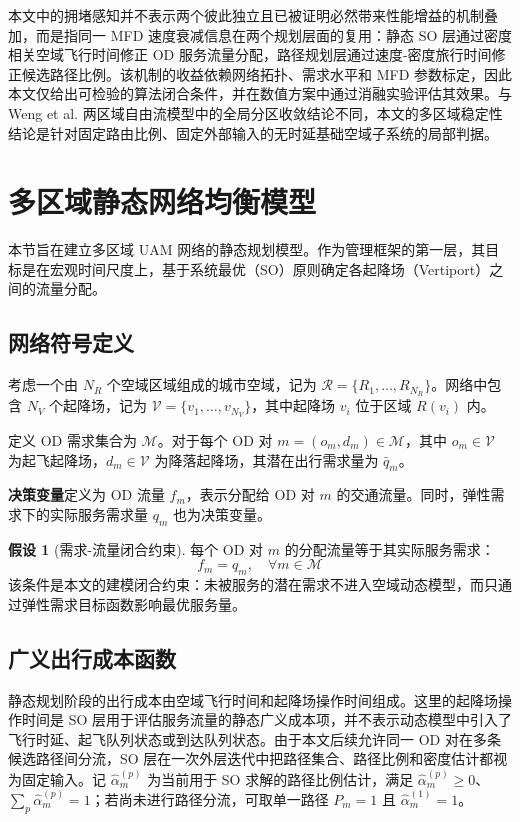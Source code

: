 \documentclass[a4paper,12pt]{article}
\theoremstyle{plain}
\theoremstyle{definition}
\newtheorem{assumption}[theorem]{假设}
\theoremstyle{remark}
\begin{document}
本文中的拥堵感知并不表示两个彼此独立且已被证明必然带来性能增益的机制叠加，而是指同一 MFD 速度衰减信息在两个规划层面的复用：静态 SO 层通过密度相关空域飞行时间修正 OD 服务流量分配，路径规划层通过速度-密度旅行时间修正候选路径比例。该机制的收益依赖网络拓扑、需求水平和 MFD 参数标定，因此本文仅给出可检验的算法闭合条件，并在数值方案中通过消融实验评估其效果。与 Weng et al. 两区域自由流模型中的全局分区收敛结论不同，本文的多区域稳定性结论是针对固定路由比例、固定外部输入的无时延基础空域子系统的局部判据。

\section{多区域静态网络均衡模型}

本节旨在建立多区域 UAM 网络的静态规划模型。作为管理框架的第一层，其目标是在宏观时间尺度上，基于系统最优（SO）原则确定各起降场（Vertiport）之间的流量分配。

\subsection{网络符号定义}
考虑一个由 $N_R$ 个空域区域组成的城市空域，记为 $\mathcal{R} = \{R_1, \dots, R_{N_R}\}$。网络中包含 $N_V$ 个起降场，记为 $\mathcal{V} = \{v_1, \dots, v_{N_V}\}$，其中起降场 $v_i$ 位于区域 $R(v_i)$ 内。

定义 OD 需求集合为 $\mathcal{M}$。对于每个 OD 对 $m = (o_m, d_m) \in \mathcal{M}$，其中 $o_m \in \mathcal{V}$ 为起飞起降场，$d_m \in \mathcal{V}$ 为降落起降场，其潜在出行需求量为 $\bar{q}_m$。

\textbf{决策变量}定义为 OD 流量 $f_m$，表示分配给 OD 对 $m$ 的交通流量。同时，弹性需求下的实际服务需求量 $q_m$ 也为决策变量。

\begin{assumption}[需求-流量闭合约束]\label{asm:flow_demand}
每个 OD 对 $m$ 的分配流量等于其实际服务需求：
\begin{equation}\label{eq:flow_demand}
    f_m = q_m, \quad \forall m \in \mathcal{M}
\end{equation}
该条件是本文的建模闭合约束：未被服务的潜在需求不进入空域动态模型，而只通过弹性需求目标函数影响最优服务量。
\end{assumption}

\subsection{广义出行成本函数}
静态规划阶段的出行成本由空域飞行时间和起降场操作时间组成。这里的起降场操作时间是 SO 层用于评估服务流量的静态广义成本项，并不表示动态模型中引入了飞行时延、起飞队列状态或到达队列状态。由于本文后续允许同一 OD 对在多条候选路径间分流，SO 层在一次外层迭代中把路径集合、路径比例和密度估计都视为固定输入。记 $\widehat\alpha_m^{(p)}$ 为当前用于 SO 求解的路径比例估计，满足 $\widehat\alpha_m^{(p)}\ge0$、$\sum_p\widehat\alpha_m^{(p)}=1$；若尚未进行路径分流，可取单一路径 $P_m=1$ 且 $\widehat\alpha_m^{(1)}=1$。
\end{document}
